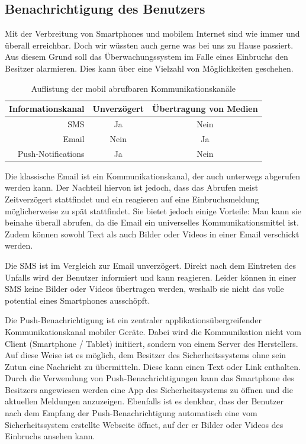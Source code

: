\subsection{Benachrichtigung des Benutzers}\label{ss:benachrichtigung}

Mit der Verbreitung von Smartphones und mobilem Internet sind wie immer und überall erreichbar. Doch wir wüssten auch gerne was bei uns zu Hause passiert. Aus diesem Grund soll das Überwachungssystem im Falle eines Einbruchs den Besitzer alarmieren. Dies kann über eine Vielzahl von Möglichkeiten geschehen. 


\begin{table}[H] 
	\centering
	\begin{tabular}{|r||c|c|}\hline
		Informationskanal & Unverzögert & Übertragung von Medien\\ \hline \hline
		SMS & Ja & Nein \\ \hline
		Email & Nein & Ja \\ \hline
		Push-Notifications & Ja & Nein \\ \hline
	\end{tabular}
	\caption{Auflistung der mobil abrufbaren Kommunikationskanäle}
	\label{t:benachrichtugung}
\end{table}

Die klassische Email ist ein Kommunikationskanal, der auch unterwegs abgerufen werden kann. Der Nachteil hiervon ist jedoch, dass das Abrufen meist Zeitverzögert stattfindet und ein reagieren auf eine Einbruchsmeldung möglicherweise zu spät stattfindet. Sie bietet jedoch einige Vorteile: Man kann sie beinahe überall abrufen, da die Email ein universelles Kommunikationsmittel ist. Zudem können sowohl Text als auch Bilder oder Videos in einer Email verschickt werden. 

Die SMS ist im Vergleich zur Email unverzögert.  Direkt nach dem Eintreten des Unfalls wird der Benutzer informiert und kann reagieren. Leider können in einer SMS keine Bilder oder Videos übertragen werden, weshalb sie nicht das volle potential eines Smartphones ausschöpft.

Die Push-Benachrichtigung ist ein zentraler applikationsübergreifender Kommunikationskanal mobiler Geräte. Dabei wird die Kommunikation nicht vom Client (Smartphone / Tablet) initiiert, sondern von einem Server des Herstellers. Auf diese Weise ist es möglich, dem Besitzer des Sicherheitssystems ohne sein Zutun eine Nachricht zu übermitteln. Diese kann einen Text oder Link enthalten.\\
Durch die Verwendung von Push-Benachrichtigungen kann das Smartphone des Besitzers angewiesen werden eine App des Sicherheitssystems zu öffnen und die aktuellen Meldungen anzuzeigen. Ebenfalls ist es denkbar, dass der Benutzer nach dem Empfang der Push-Benachrichtigung automatisch eine vom Sicherheitssystem erstellte Webseite öffnet, auf der er Bilder oder Videos des Einbruchs ansehen kann.


